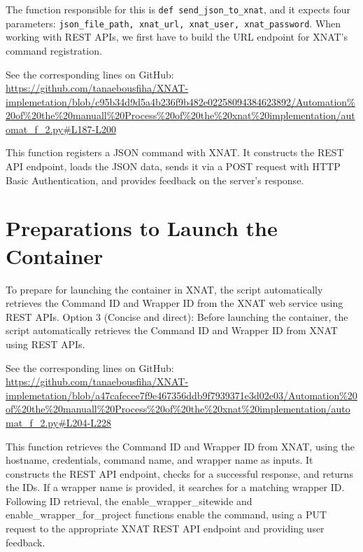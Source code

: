 The function responsible for this is \texttt{def send\_json\_to\_xnat}, and it expects four parameters: \texttt{json\_file\_path, xnat\_url, xnat\_user, xnat\_password}. When working with REST APIs, we first have to build the URL endpoint for XNAT’s command registration.
 


\noindent\footnotesize See the corresponding lines on GitHub:\url{ https://github.com/tanaebousfiha/XNAT-implemetation/blob/c95b34d9d5a4b236f9b482e02258094384623892/Automation%20of%20the%20manuall%20Process%20of%20the%20xnat%20implementation/automat_f_2.py#L187-L200}

This function registers a JSON command with XNAT. It constructs the REST API endpoint, loads the JSON data, sends it via a POST request with HTTP Basic Authentication, and provides feedback on the server's response.

\section{Preparations to Launch the Container}

To prepare for launching the container in XNAT, the script automatically retrieves the Command ID and Wrapper ID from the XNAT web service using REST APIs.
Option 3 (Concise and direct): Before launching the container, the script automatically retrieves the Command ID and Wrapper ID from XNAT using REST APIs.


\noindent\footnotesize See the corresponding lines on GitHub:\url{ https://github.com/tanaebousfiha/XNAT-implemetation/blob/a47cafecee7f9e467356ddb9f7939371e3d02e03/Automation%20of%20the%20manuall%20Process%20of%20the%20xnat%20implementation/automat_f_2.py#L204-L228}



This function retrieves the Command ID and Wrapper ID from XNAT, using the hostname, credentials, command name, and wrapper name as inputs. It constructs the REST API endpoint, checks for a successful response, and returns the IDs. If a wrapper name is provided, it searches for a matching wrapper ID. Following ID retrieval, the enable\_wrapper\_sitewide and enable\_wrapper\_for\_project functions enable the command, using a PUT request to the appropriate XNAT REST API endpoint and providing user feedback.

